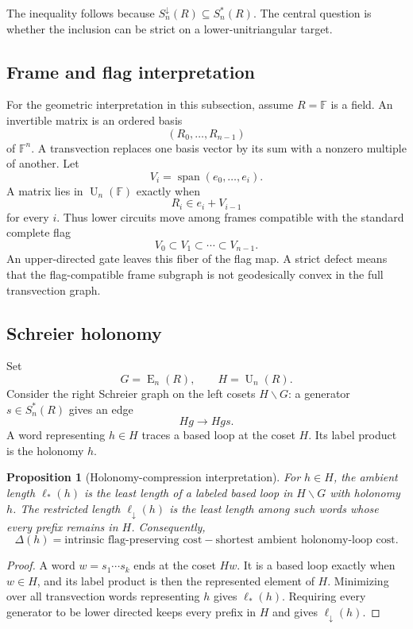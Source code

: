 \documentclass[11pt]{amsart}
\numberwithin{equation}{section}
\newtheorem{proposition}[theorem]{Proposition}
\theoremstyle{definition}
\theoremstyle{remark}
\newcommand{\F}{\mathbb F}
\newcommand{\Egrp}{\operatorname{E}}
\newcommand{\U}{\operatorname{U}}
\newcommand{\Span}{\operatorname{span}}
\newcommand{\ellDown}{\ell_{\downarrow}}
\newcommand{\ellAll}{\ell_{*}}
\newcommand{\DeltaDef}{\Delta}
\begin{document}
The inequality follows because $S_n^\downarrow(R)\subseteq S_n^*(R)$.  The central question is whether the inclusion can be strict on a lower-unitriangular target.

\subsection{Frame and flag interpretation}

For the geometric interpretation in this subsection, assume $R=\F$ is a field.  An invertible matrix is an ordered basis
\[
(R_0,\ldots,R_{n-1})
\]
of $\F^n$.  A transvection replaces one basis vector by its sum with a nonzero multiple of another.  Let
\[
V_i=\Span(e_0,\ldots,e_i).
\]
A matrix lies in $\U_n(\F)$ exactly when
\[
R_i\in e_i+V_{i-1}
\]
for every $i$.  Thus lower circuits move among frames compatible with the standard complete flag
\[
V_0\subset V_1\subset\cdots\subset V_{n-1}.
\]
An upper-directed gate leaves this fiber of the flag map.  A strict defect means that the flag-compatible frame subgraph is not geodesically convex in the full transvection graph.

\subsection{Schreier holonomy}

Set
\[
G=\Egrp_n(R),
\qquad
H=\U_n(R).
\]
Consider the right Schreier graph on the left cosets $H\backslash G$: a generator $s\in S_n^*(R)$ gives an edge
\[
Hg\longrightarrow Hgs.
\]
A word representing $h\in H$ traces a based loop at the coset $H$.  Its label product is the holonomy $h$.

\begin{proposition}[Holonomy-compression interpretation]\label{prop:schreier-holonomy}
For $h\in H$, the ambient length $\ellAll(h)$ is the least length of a labeled based loop in $H\backslash G$ with holonomy $h$.  The restricted length $\ellDown(h)$ is the least length among such words whose every prefix remains in $H$.  Consequently,
\[
\DeltaDef(h)
=
\text{intrinsic flag-preserving cost}
-
\text{shortest ambient holonomy-loop cost}.
\]
\end{proposition}

\begin{proof}
A word $w=s_1\cdots s_k$ ends at the coset $Hw$.  It is a based loop exactly when $w\in H$, and its label product is then the represented element of $H$.  Minimizing over all transvection words representing $h$ gives $\ellAll(h)$.  Requiring every generator to be lower directed keeps every prefix in $H$ and gives $\ellDown(h)$.
\end{proof}
\end{document}
